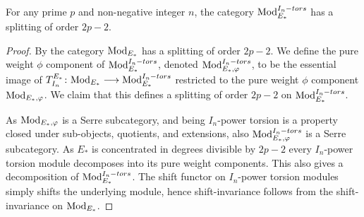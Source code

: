 \begin{lemma}
    \label{ch2:lm:splitting-torsion-modules}
    For any prime $p$ and non-negative integer $n$, the category $\mathrm{Mod}_{E_*}^{I_n-tors}$ has a splitting of order $2p-2$. 
\end{lemma}
\begin{proof}
    By \cite[8.1]{patchkoria-pstragowski_2021} the category $\mathrm{Mod}_{E_*}$ has a splitting of order $2p-2$. We define the pure weight $\phi$ component of $\mathrm{Mod}_{E_*}^{I_n-tors}$, denoted $\mathrm{Mod}_{E_*, \varphi}^{I_n-tors}$, to be the essential image of $T_{I_n}^{E_*}\colon \mathrm{Mod}_{E_*}\longrightarrow \mathrm{Mod}_{E_*}^{I_n-tors}$ restricted to the pure weight $\phi$ component $\mathrm{Mod}_{E_*, \varphi}$. We claim that this defines a splitting of order $2p-2$ on $\mathrm{Mod}_{E_*}^{I_n-tors}$. 

    As $\mathrm{Mod}_{E_*, \varphi}$ is a Serre subcategory, and being $I_n$-power torsion is a property closed under sub-objects, quotients, and extensions, also $\mathrm{Mod}_{E_*, \varphi}^{I_n-tors}$ is a Serre subcategory. As $E_*$ is concentrated in degrees divisible by $2p-2$ every $I_n$-power torsion module decomposes into its pure weight components. This also gives a decomposition of $\mathrm{Mod}_{E_*}^{I_n-tors}$. The shift functor on $I_n$-power torsion modules simply shifts the underlying module, hence shift-invariance follows from the shift-invariance on $\mathrm{Mod}_{E_*}$. 

    
\end{proof}

